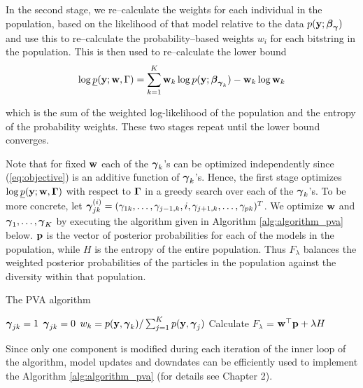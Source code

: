 In the second stage, we re--calculate the weights for each individual in the
population, based on the likelihood of that model relative to the data $p({\bf y};
{\boldsymbol \beta}_{\boldsymbol \gamma})$ and use this to re--calculate the probability--based weights
$w_i$ for each bitstring in the population. This is then used to re--calculate
the lower bound
\[
	\log \underline{p}({\bf y}; {\bf w}, \Gamma) = \sum_{k=1}^K {\bf w}_k \log p({\bf y}; {\boldsymbol \beta}_{{\boldsymbol \gamma}_k}) - {\bf w}_k \log {\bf w}_k
\]

\noindent 
which is the sum of the weighted log-likelihood of the population and the
entropy of the probability weights.  These two stages repeat until the lower
bound converges.

Note that for fixed ${\bf w}$ each of the ${\boldsymbol \gamma}_k$'s can be optimized
independently since (\ref{eq:objective}) is an additive function of
${\boldsymbol \gamma}_k$'s. Hence, the first stage optimizes $\log
\underline{p}({\bf y};{\bf w},{\boldsymbol \Gamma})$ with respect to ${\boldsymbol \Gamma}$ in a greedy search
over each of the  ${\boldsymbol \gamma}_k$'s.  To be more concrete, let ${\boldsymbol \gamma}_{jk}^{(i)}
= (\gamma_{1k},\ldots,\gamma_{j-1,k},i,\gamma_{j+1,k},\ldots,\gamma_{pk})^T$.
We optimize ${\bf w}$ and ${\boldsymbol \gamma}_1,\ldots,{\boldsymbol \gamma}_K$ by executing the algorithm
given in Algorithm \ref{alg:algorithm_pva} below. ${\bf p}$ is the vector of
posterior probabilities for each of the models  in the population, while $H$ is
the entropy of the entire population. Thus $F_\lambda$ balances the weighted
posterior  probabilities of the particles in the population against the
diversity within that population.

\begin{algorithm}\label{alg:updateGamma}
	\caption{The PVA algorithm}
	\label{alg:algorithm_pva}
	\begin{algorithmic}
		\medskip 
		\medskip
				\medskip
					\medskip
						\medskip
						\STATE ${\boldsymbol \gamma}_{jk} = 1$
					\ELSE
					\medskip
						\STATE ${\boldsymbol \gamma}_{jk} = 0$
					\ENDIF
				\ENDFOR
				\medskip
				\STATE $w_k = p({\bf y}, {\boldsymbol \gamma}_k) / \sum_{j=1}^K p({\bf y}, {\boldsymbol \gamma}_j)$
			\ENDFOR
			\medskip
			\STATE Calculate $F_\lambda$ = ${\bf w}^\top {\bf p} + \lambda H$
		\ENDWHILE
	\end{algorithmic}
\end{algorithm}

    \noindent 
    Since only one component is modified during each iteration of the inner
    loop of the algorithm, model updates and downdates can be efficiently used
    to implement the Algorithm \ref{alg:algorithm_pva} (for details see
    Chapter 2).


